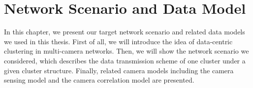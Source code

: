 \chapter{Network Scenario and Data Model}
\label{sec::scenarioAndModel}
In this chapter, we present our target network scenario and related data models we used in this thesis.
First of all, we will introduce the idea of data-centric clustering in multi-camera networks.
Then, we will show the network scenario we considered, which describes the data transmission scheme of one cluster under a given cluster structure.
Finally, related camera models including the camera sensing model and the camera correlation model are presented.


